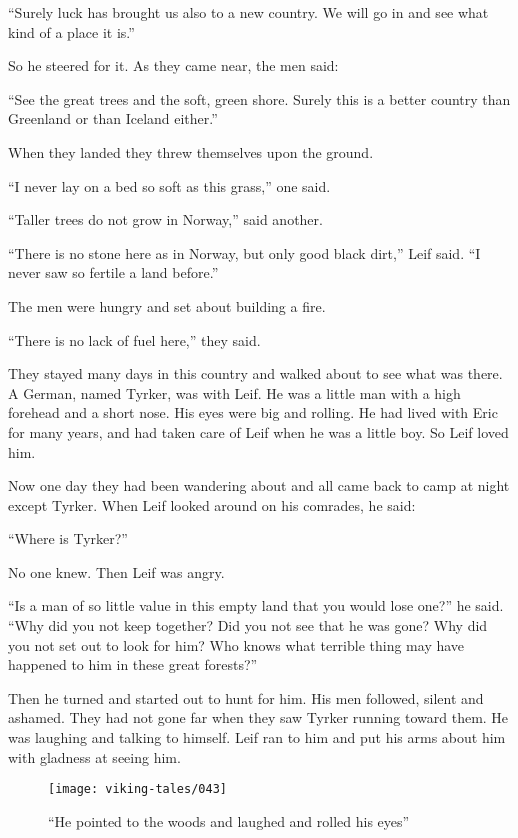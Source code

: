``Surely luck has brought us also to a new country. We will go in and
see what kind of a place it is.''

So he steered for it. As they came near, the men said:

``See the great trees and the soft, green shore. Surely this is a better
country than Greenland or than Iceland either.''

When they landed they threw themselves upon the ground.

``I never lay on a bed so soft as this grass,'' one said.

``Taller trees do not grow in Norway,'' said another.

``There is no stone here as in Norway, but only good black dirt,'' Leif
said. ``I never saw so fertile a land before.''

The men were hungry and set about building a fire.

``There is no lack of fuel here,'' they said.

They stayed many days in this country and walked about to see what was
there. A German, named Tyrker, was with Leif. He was a little man with a
high forehead and a short nose. His eyes were big and rolling. He had
lived with Eric for many years, and had taken care of Leif when he was a
little boy. So Leif loved him.

Now one day they had been wandering about and all came back to camp at
night except Tyrker. When Leif looked around on his comrades, he said:

``Where is Tyrker?''

No one knew. Then Leif was angry.

``Is a man of so little value in this empty land that you would lose
one?'' he said. ``Why did you not keep together? Did you not see that he
was gone? Why did you not set out to look for him? Who knows what
terrible thing may have happened to him in these great forests?''

Then he turned and started out to hunt for him. His men followed, silent
and ashamed. They had not gone far when they saw Tyrker running toward
them. He was laughing and talking to himself. Leif ran to him and put
his arms about him with gladness at seeing him.

\begin{figure}[ht]
    \centering
    \texttt{[image: viking-tales/043]}
    \caption{``He pointed to the woods and laughed and rolled his eyes''}
\end{figure}


